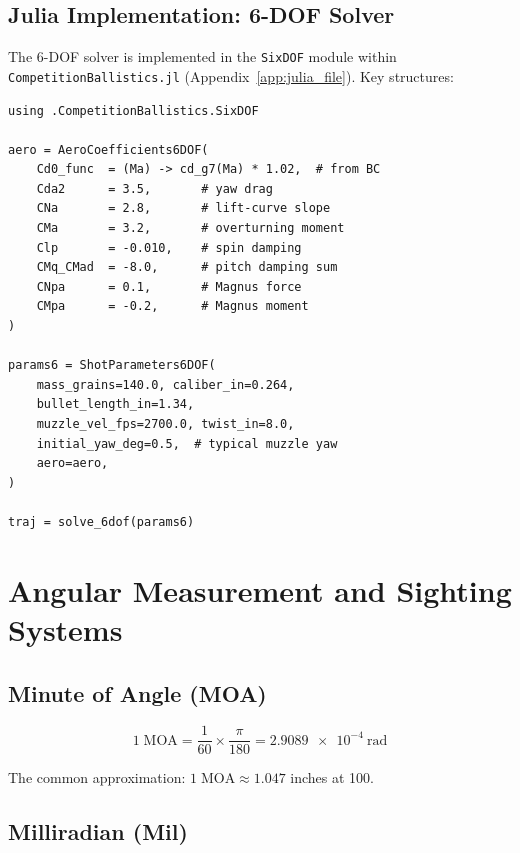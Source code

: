 \documentclass[11pt,twoside,openright]{report}
\begin{document}
\section{Julia Implementation: 6-DOF Solver}

The 6-DOF solver is implemented in the \texttt{SixDOF} module within \texttt{CompetitionBallistics.jl} (Appendix~\ref{app:julia_file}). Key structures:

\begin{lstlisting}[caption={6-DOF solver usage example},label={lst:6dof_example}]
using .CompetitionBallistics.SixDOF

aero = AeroCoefficients6DOF(
    Cd0_func  = (Ma) -> cd_g7(Ma) * 1.02,  # from BC
    Cda2      = 3.5,       # yaw drag
    CNa       = 2.8,       # lift-curve slope
    CMa       = 3.2,       # overturning moment
    Clp       = -0.010,    # spin damping
    CMq_CMad  = -8.0,      # pitch damping sum
    CNpa      = 0.1,       # Magnus force
    CMpa      = -0.2,      # Magnus moment
)

params6 = ShotParameters6DOF(
    mass_grains=140.0, caliber_in=0.264,
    bullet_length_in=1.34,
    muzzle_vel_fps=2700.0, twist_in=8.0,
    initial_yaw_deg=0.5,  # typical muzzle yaw
    aero=aero,
)

traj = solve_6dof(params6)
\end{lstlisting}


\chapter{Angular Measurement and Sighting Systems}
\label{ch:sighting}

\section{Minute of Angle (MOA)}

\begin{equation}
  1\;\text{MOA} = \frac{1}{60} \times \frac{\pi}{180} = \SI{2.9089e-4}{\radian}
  \label{eq:moa_rad}
\end{equation}

The common approximation: $1\;\text{MOA} \approx 1.047$ inches at \SI{100}{\yard}.

\section{Milliradian (Mil)}
\end{document}
